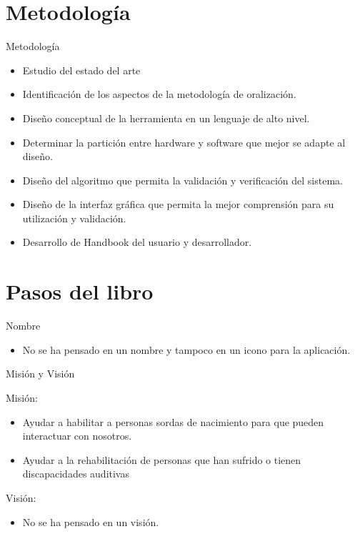 \documentclass[pstricks, 12pt]{beamer}
\begin{document}
\section{Metodología}
\begin{frame}{Metodología}
 \begin{itemize}
  \item Estudio del estado del arte
  \item Identificación de los aspectos de la metodología de oralización.
  \item Diseño conceptual de la herramienta en un lenguaje de alto nivel.
  \item Determinar la partición entre hardware y software que mejor se adapte al diseño.
  \item Diseño del algoritmo que permita la validación y verificación del sistema.
  \item Diseño de la interfaz gráfica que permita la mejor comprensión para su utilización y validación.
  \item Desarrollo de Handbook del usuario y desarrollador.
 \end{itemize}
\end{frame}

\section{Pasos del libro}

\begin{frame}{Nombre}
 \begin{itemize}
  \item No se ha pensado en un nombre y tampoco en un icono para la aplicación.
 \end{itemize}
\end{frame}

\begin{frame}{Misión y Visión}
 
Misión: 
 \begin{itemize}
  \item Ayudar a habilitar a personas sordas de nacimiento para que pueden interactuar con nosotros.
  \item Ayudar a la rehabilitación de personas que han sufrido o tienen discapacidades auditivas
 \end{itemize}

Visión:
\begin{itemize}
 \item No se ha pensado en un visión.
\end{itemize}
\end{frame}
\end{document}

